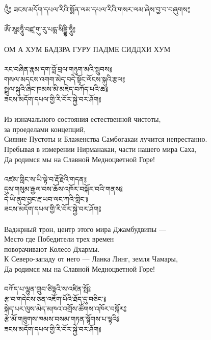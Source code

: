 \ru
\newpage
\ru
{}\\

{\ti འུྃ༔ ཟངས་མདོག་དཔལ་རིའི་སྨོན་ལམ་དཔལ་རིའི་གསར་ལམ་ཞེས་བྱ་བ་བཞུགས༔}\\
\\
{\ti ཨོཾ་ཨཱཿཧཱུྃ་བཛྲ་གུ་རུ་པདྨ་སིདྡྷི་ཧཱུྃ༔}\\
\\
ОМ А ХУМ БАДЗРА ГУРУ ПАДМЕ СИДДХИ ХУМ\\
\\
{\ti རང་བཞིན་རྣམ་དག་བློ་བྲལ་གཉུག་མའི་སྦུབས༔\\
གསལ་མདངས་འགག་མེད་བདེ་སྟོང་ལོངས་སྐུའི་རྩལ༔\\
སྤྲུལ་སྐུའི་ཞིང་ཁམས་མི་མཇེད་བཀོད་པའི་ཆ༔\\
ཟངས་མདོག་དཔལ་གྱི་རི་བོར་སྐྱེ་བར་ཤོག༔}\\
\\
Из изначального состояния естественной чистоты, \\ \indent за проеделами концепций,\\
Сияние Пустоты и Блаженства Самбогакаи лучится непрестанно.\\
Пребывая в измерении Нирманакаи, части нашего мира Саха,\\
Да родимся мы на Славной Медноцветной Горе!\\
\\
{\ti འཛམ་གླིང་ས་ཡི་ལྟེ་བ་རྡོ་རྗེའི་གདན༔\\
དུས་གསུམ་རྒྱལ་བས་ཆོས་འཁོར་བསྐོར་བའི་གནས༔\\
དེ་ཡི་ནུབ་བྱང་རྔ་ཡབ་ལང་ཀའི་གླིང་༔\\
ཟངས་མདོག་དཔལ་གྱི་རི་བོར་སྐྱེ་བར་ཤོག༔}\\
\\
Ваджрный трон, центр этого мира Джамбудвипы —\\
Место где Победители трех времен \\ \indent поворачивают Колесо Дхармы.\\
К Северо-западу от него — Ланка Линг, земля Чамары,\\
Да родимся мы на Славной Медноцветной Горе!\\
\\
\newpage
{\ti བཀོད་པ་ལྷུན་གྲུབ་ཙིཏྟའི་ས་འཛིན་སྤོ༔\\
རྩ་བ་གདེངས་ཅན་འཇོག་པོའི་ཐོད་དུ་བཅིང་༔\\
སྐེད་པར་ལུས་མེད་མཁའ་འགྲོས་ཚོགས་འཁོར་བསྐོར༔\\
རྩེ་མོ་གཟུགས་ཁམས་བསམ་གཏན་སྙོགས་པ་ལྟའི༔\\
ཟངས་མདོག་དཔལ་གྱི་རི་བོར་སྐྱེ་བར་ཤོག༔}\\
